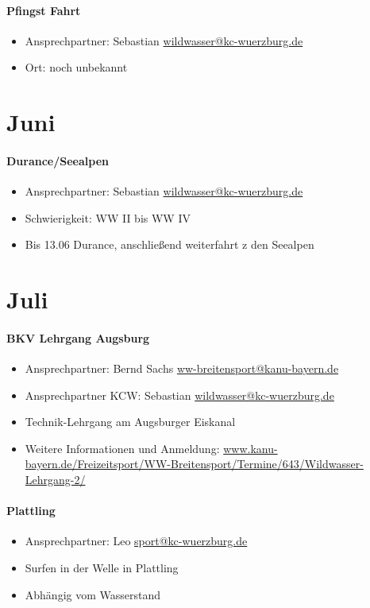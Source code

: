 \documentclass[12pt, a4paper]{report}
\begin{document}
\paragraph{Pfingst Fahrt}
\begin{itemize}
    \item Ansprechpartner: Sebastian \href{mailto:wildwasser@kc-wuerzburg.de}{wildwasser@kc-wuerzburg.de}
    \item Ort: noch unbekannt
\end{itemize}

\section*{Juni}\paragraph{Durance/Seealpen}
\begin{itemize}
    \item Ansprechpartner: Sebastian \href{mailto:wildwasser@kc-wuerzburg.de}{wildwasser@kc-wuerzburg.de}
    \item Schwierigkeit: WW II bis WW IV
    \item Bis 13.06 Durance, anschließend weiterfahrt z den Seealpen
\end{itemize}

\section*{Juli}\paragraph{BKV Lehrgang Augsburg}
\begin{itemize}
    \item Ansprechpartner: Bernd Sachs \href{mailto:ww-breitensport@kanu-bayern.de}{ww-breitensport@kanu-bayern.de}
    \item Ansprechpartner KCW: Sebastian \href{mailto:wildwasser@kc-wuerzburg.de}{wildwasser@kc-wuerzburg.de}
    \item Technik-Lehrgang am Augsburger Eiskanal
    \item Weitere Informationen und Anmeldung: \url{www.kanu-bayern.de/Freizeitsport/WW-Breitensport/Termine/643/Wildwasser-Lehrgang-2/}
\end{itemize}

\paragraph{Plattling}
\begin{itemize}
    \item Ansprechpartner: Leo \href{mailto:sport@kc-wuerzburg.de}{sport@kc-wuerzburg.de}
    \item Surfen in der Welle in Plattling
    \item Abhängig vom Wasserstand
\end{itemize}
\end{document}
